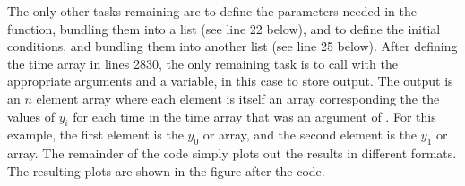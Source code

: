 \documentclass[letterpaper,10pt,english]{sphinxmanual}
\begin{document}
\sphinxAtStartPar
The only other tasks remaining are to define the parameters needed in the function, bundling them into a list (see line 22 below),  and to define the initial conditions, and bundling them into another list (see line 25 below).  After defining the time array in lines 28\sphinxhyphen{}30, the only remaining task is to call  with the appropriate arguments and a variable,  in this case to store output.  The output  is an \(n\) element array where each element is itself an array corresponding the the values of \(y_i\) for each time in the time  array that was an argument of .  For this example, the first element  is the \(y_0\) or  array, and the second element  is the \(y_1\) or  array.  The remainder of the code simply plots out the results in different formats.  The resulting plots are shown in the figure {\hyperref[\detokenize{chap9/chap9_scipy:fig-odepend}]{}} after the code.
\end{document}
